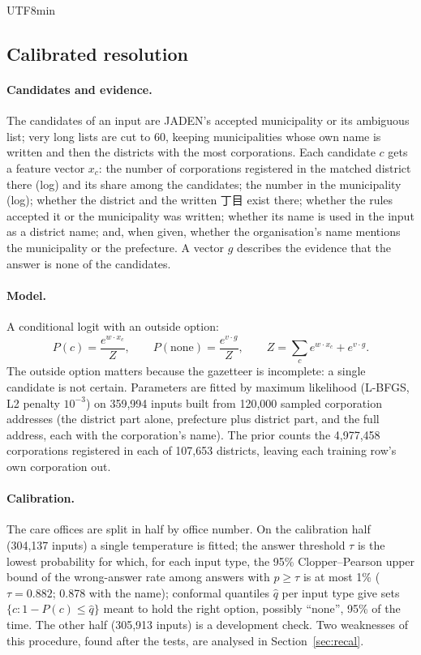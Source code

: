 \documentclass[10pt]{article}
\begin{document}
\begin{CJK}{UTF8}{min}
\subsection{Calibrated resolution}
\paragraph{Candidates and evidence.} The candidates of an input are JADEN's accepted municipality or its
ambiguous list; very long lists are cut to 60, keeping municipalities whose own name is written and then
the districts with the most corporations. Each candidate $c$ gets a feature vector $x_c$: the number of
corporations registered in the matched district there (log) and its share among the candidates; the
number in the municipality (log); whether the district and the written 丁目 exist there; whether the
rules accepted it or the municipality was written; whether its name is used in the input as a district
name; and, when given, whether the organisation's name mentions the municipality or the prefecture. A
vector $g$ describes the evidence that the answer is none of the candidates.

\paragraph{Model.} A conditional logit with an outside option:
\begin{equation}
P(c) = \frac{e^{w\cdot x_c}}{Z},\qquad P(\text{none}) = \frac{e^{v\cdot g}}{Z},\qquad
Z = \sum_{c} e^{w\cdot x_c} + e^{v\cdot g}.
\end{equation}
The outside option matters because the gazetteer is incomplete: a single candidate is not certain.
Parameters are fitted by maximum likelihood (L-BFGS, L2 penalty $10^{-3}$) on 359,994 inputs built
from 120,000 sampled corporation addresses (the district part alone, prefecture plus district part, and
the full address, each with the corporation's name). The prior counts the 4,977,458 corporations
registered in each of 107,653 districts, leaving each training row's own corporation out.

\paragraph{Calibration.} The care offices are split in half by office number. On the calibration half
(304,137 inputs) a single temperature is fitted; the answer threshold $\tau$ is the lowest probability
for which, for each input type, the 95\% Clopper--Pearson upper bound of the wrong-answer rate among
answers with $p \ge \tau$ is at most 1\% ($\tau = 0.882$; 0.878 with the name); conformal quantiles
$\hat q$ per input type give sets $\{c : 1 - P(c) \le \hat q\}$ meant to hold the right option, possibly
``none'', 95\% of the time. The other half (305,913 inputs) is a development check. Two weaknesses of
this procedure, found after the tests, are analysed in Section~\ref{sec:recal}.


\end{CJK}
\end{document}
